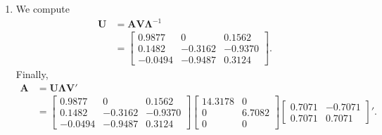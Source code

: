 \documentclass[10pt]{article}
\begin{document}
\begin{enumerate}[1)]
\item
We compute
\begin{align*}
\pmb{U}&=\pmb{A}\pmb{V}\pmb{\Lambda}^{-1}\\
&=
  \begin{bmatrix}
    0.9877 & 0 & 0.1562\\
    0.1482 & -0.3162 & -0.9370\\
    -0.0494 & -0.9487 & 0.3124
  \end{bmatrix}
.
\end{align*}
Finally,
\begin{align*}
\pmb{A}&=\pmb{U}\pmb{\Lambda}\pmb{V}'\\
&=
  \begin{bmatrix}
    0.9877 & 0 & 0.1562\\
    0.1482 & -0.3162 & -0.9370\\
    -0.0494 & -0.9487 & 0.3124
  \end{bmatrix}
  \begin{bmatrix}
    14.3178 & 0\\
    0 & 6.7082\\
    0 & 0
  \end{bmatrix}
  \begin{bmatrix}
    0.7071 & -0.7071\\
    0.7071 & 0.7071
  \end{bmatrix}
'.
\end{align*}


\end{enumerate}
\end{document}

